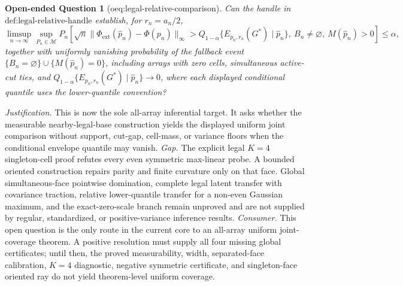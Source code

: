 \documentclass{article}
\newtheorem{openendedquestion}{Open-ended Question}
\begin{document}
\begin{openendedquestion}[oeq:legal-relative-comparison]\label{oeq:legal-relative-comparison}
Can the handle in \(\text{def:legal-relative-handle}\) establish, for \(r_n=a_n/2\), \[\limsup_{n\to\infty}\sup_{P_n\in\mathcal M}P_n\!\left[\sqrt n\|\Phi_{\mathrm{ext}}(\widehat p_n)-\Phi(p_n)\|_\infty>Q_{1-\alpha}\{E_{p_n,r_n}(G^*)\mid\widehat p_n\},\ B_n\ne\varnothing,\ M(\widehat p_n)>0\right]\le\alpha,\] together with uniformly vanishing probability of the fallback event \(\{B_n=\varnothing\}\cup\{M(\widehat p_n)=0\}\), including arrays with zero cells, simultaneous active-cut ties, and \(Q_{1-\alpha}\{E_{p_n,r_n}(G^*)\mid\widehat p_n\}\to0\), where each displayed conditional quantile uses the lower-quantile convention?
\end{openendedquestion}
\par\smallskip\noindent \textit{Justification.} This is now the sole all-array inferential target. It asks whether the measurable nearby-legal-base construction yields the displayed uniform joint comparison without support, cut-gap, cell-mass, or variance floors when the conditional envelope quantile may vanish. \textit{Gap.} The explicit legal \(K=4\) singleton-cell proof refutes every even symmetric max-linear probe. A bounded oriented construction repairs parity and finite curvature only on that face. Global simultaneous-face pointwise domination, complete legal latent transfer with covariance traction, relative lower-quantile transfer for a non-even Gaussian maximum, and the exact-zero-scale branch remain unproved and are not supplied by regular, standardized, or positive-variance inference results. \textit{Consumer.} This open question is the only route in the current core to an all-array uniform joint-coverage theorem. A positive resolution must supply all four missing global certificates; until then, the proved measurability, width, separated-face calibration, \(K=4\) diagnostic, negative symmetric certificate, and singleton-face oriented ray do not yield theorem-level uniform coverage.
\end{document}
